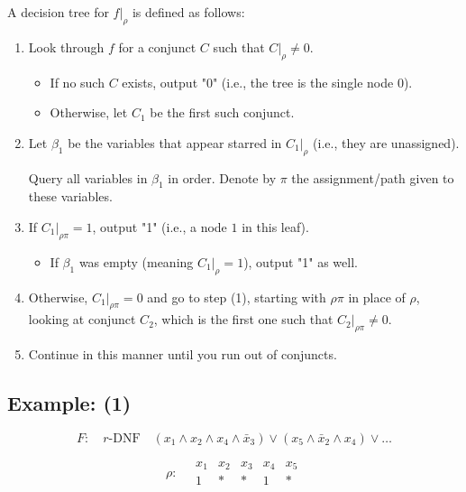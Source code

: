 A decision tree for \( f|_{\rho} \) is defined as follows:

\begin{enumerate}
    \item Look through \( f \) for a conjunct \( C \) such that \( C|_{\rho} \neq 0 \).
    \begin{itemize}
        \item If no such \( C \) exists, output "0" (i.e., the tree is the single node \( 0 \)).
        \item Otherwise, let \( C_1 \) be the first such conjunct.
    \end{itemize}
    
    \item Let \( \beta_1 \) be the variables that appear starred in \( C_1|_{\rho} \) (i.e., they are unassigned).
    
    Query all variables in \( \beta_1 \) in order. Denote by \( \pi \) the assignment/path given to these variables.
    
    \item If \( C_1|_{\rho\pi} = 1 \), output "1" (i.e., a node \( 1 \) in this leaf).
    \begin{itemize}
        \item If \( \beta_1 \) was empty (meaning \( C_1|_{\rho} = 1 \)), output "1" as well.
    \end{itemize}
    
    \item Otherwise, \( C_1|_{\rho\pi} = 0 \) and go to step (1), starting with \( \rho\pi \) in place of \( \rho \), looking at conjunct \( C_2 \), which is the first one such that \( C_2|_{\rho\pi} \neq 0 \).
    
    \item Continue in this manner until you run out of conjuncts.
\end{enumerate}

\subsection*{Example: (1)}

\[
F: \quad r\text{-DNF} \quad (x_1 \land x_2 \land x_4 \land \bar{x}_3) \lor (x_5 \land \bar{x}_2 \land x_4) \lor \dots
\]

\[
\rho: \quad 
\begin{array}{ccccc}
x_1 & x_2 & x_3 & x_4 & x_5 \\
1 & * & * & 1 & *
\end{array}
\]

